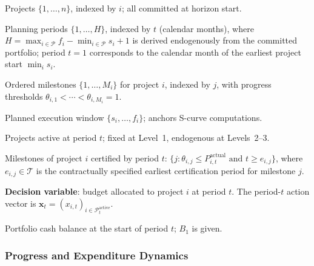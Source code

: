 \begin{description}[leftmargin=2.6cm, labelwidth=2.4cm]
  \item[$\mathcal{P}$]
    Projects $\{1,\ldots,n\}$, indexed by $i$; all committed at horizon
    start.
  \item[$\mathcal{T}$]
    Planning periods $\{1,\ldots,H\}$, indexed by $t$ (calendar months),
    where $H = \max_{i\in\mathcal{P}} f_i- \min_{i\in\mathcal{P}} s_i + 1$
    is derived endogenously from the committed portfolio; period $t=1$
    corresponds to the calendar month of the earliest project start
    $\min_i s_i$.
  \item[$\mathcal{M}_i$]
    Ordered milestones $\{1,\ldots,M_i\}$ for project $i$, indexed by $j$,
    with progress thresholds $\theta_{i,1} < \cdots < \theta_{i,M_i} = 1$.
  \item[$\mathcal{A}_i^{\mathrm{plan}}$]
    Planned execution window $\{s_i,\ldots,f_i\}$; anchors S-curve
    computations.
  \item[$\mathcal{P}_t^{\mathrm{active}}$]
    Projects active at period $t$; fixed at Level~1, endogenous at
    Levels~2--3.
  \item[$\mathcal{M}_i^{\mathrm{cert}}(t)$]
    Milestones of project $i$ certified by period $t$:
    $\{j : \theta_{i,j} \leq P_{i,t}^{\mathrm{actual}}
    \text{ and } t \geq e_{i,j}\}$,
    where $e_{i,j} \in \mathcal{T}$ is the contractually specified
    earliest certification period for milestone $j$.
  \item[$x_{i,t} \geq 0$]
    \textbf{Decision variable}: budget allocated to project $i$ at period
    $t$. The period-$t$ action vector is
    $\mathbf{x}_t =
    (x_{i,t})_{i \in \mathcal{P}_t^{\mathrm{active}}}$.
  \item[$B_t \geq 0$]
    Portfolio cash balance at the start of period $t$; $B_1$ is given.
\end{description}

\subsubsection{Progress and Expenditure Dynamics}
\label{subsubsec:progress}

